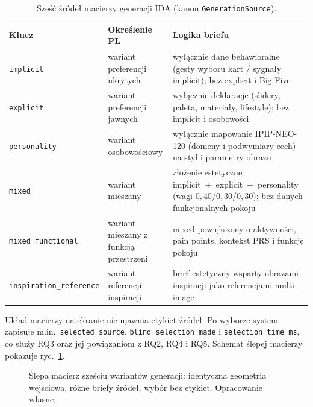 \begin{table}[htbp]
  \centering
  \caption{Sześć źródeł macierzy generacji IDA (kanon \texttt{GenerationSource}).}
  \label{tab:ch07:sources}
  \begin{tabular}{@{}p{}p{}p{}@{}}
    \toprule
    Klucz & Określenie PL & Logika briefu \\
    \midrule
    \texttt{implicit} &
    wariant preferencji ukrytych &
    wyłącznie dane behawioralne (gesty wyboru kart / sygnały implicit); bez explicit i Big Five \\
    \texttt{explicit} &
    wariant preferencji jawnych &
    wyłącznie deklaracje (slidery, paleta, materiały, lifestyle); bez implicit i osobowości \\
    \texttt{personality} &
    wariant osobowościowy &
    wyłącznie mapowanie IPIP-NEO-120 (domeny i podwymiary cech) na styl i parametry obrazu \\
    \texttt{mixed} &
    wariant mieszany &
    złożenie estetyczne implicit~+~explicit~+~personality (wagi $0{,}40$/$0{,}30$/$0{,}30$); bez danych funkcjonalnych pokoju \\
    \texttt{mixed\_functional} &
    wariant mieszany z funkcją przestrzeni &
    mixed powiększony o aktywności, pain points, kontekst PRS i funkcję pokoju \\
    \texttt{inspiration\_reference} &
    wariant referencji inspiracji &
    brief estetyczny wsparty obrazami inspiracji jako referencjami multi-image \\
    \bottomrule
  \end{tabular}
\end{table}

Układ macierzy na ekranie nie ujawnia etykiet źródeł. Po wyborze system zapisuje m.in.\ \texttt{selected\_source}, \texttt{blind\_selection\_made} i \texttt{selection\_time\_ms}, co służy RQ3 oraz jej powiązaniom z RQ2, RQ4 i RQ5. Schemat ślepej macierzy pokazuje ryc.~\ref{fig:ch07:matrix}.

\begin{figure}[htbp]
  \centering
  \caption{Ślepa macierz sześciu wariantów generacji: identyczna geometria wejściowa, różne briefy źródeł, wybór bez etykiet. Opracowanie własne.}
  \label{fig:ch07:matrix}
\end{figure}

